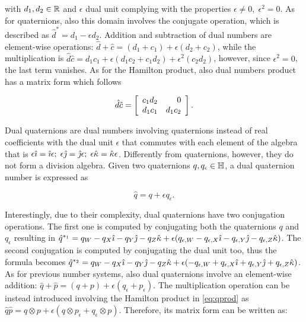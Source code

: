 \documentclass[3p, preprint, twocolumn]{elsarticle}
\begin{document}
\noindent with $d_1, d_2 \in \mathbb{R}$ and $\epsilon$ dual unit complying with the properties $\epsilon \neq 0, \; \epsilon^2 = 0$. As for quaternions, also this domain involves the conjugate operation, which is described as $\hat{d}^* = d_1 - \epsilon d_2$. Addition and subtraction of dual numbers are element-wise operations: $\hat{d} + \hat{c} = (d_1 + c_1) + \epsilon (d_2 + c_2)$, while the multiplication is $\hat{d}\hat{c} = d_1c_1 + \epsilon (d_1c_2 + c_1d_2) + \epsilon^2 (c_2d_2)$, however, since $\epsilon^2=0$, the last term vanishes. As for the Hamilton product, also dual numbers product has a matrix form which follows

\begin{equation}
\label{eq:dualprod}
    \hat{d}\hat{c} = \left[ {\begin{array}{*{20}c}
    \hfill {c_1d_2} & \hfill \hfill {0} \\
   \hfill {d_1c_1} & {d_1c_2} \\
    \end{array}} \right].
\end{equation}


Dual quaternions are dual numbers involving quaternions instead of real coefficients with the dual unit $\epsilon$ that commutes with each element of the algebra that is $\epsilon {\hat{\imath}} = {\hat{\imath}} \epsilon; \; \epsilon {\hat{\jmath}} = {\hat{\jmath}} \epsilon; \; \epsilon {\hat{\kappa}} = {\hat{\kappa}} \epsilon$. Differently from quaternions, however, they do not form a division algebra. Given two quaternions $q, q_{\epsilon} \in \mathbb{H}$, a dual quaternion number is expressed as

\begin{equation}
    \hat{q} = q + \epsilon q_{\epsilon}.
\end{equation}

Interestingly, due to their complexity, dual quaternions have two conjugation operations. The first one is computed by conjugating both the quaternions $q$ and $q_{\epsilon}$ resulting in $\hat{q}^{*_1} = q_W - q_X {\hat{\imath}} - q_Y {\hat{\jmath}} - q_Z {\hat{\kappa}} + \epsilon(q_{\epsilon, W} - q_{\epsilon, X} {\hat{\imath}} - q_{\epsilon, Y} {\hat{\jmath}} - q_{\epsilon, Z} {\hat{\kappa}})$. The second conjugation is computed by conjugating the dual unit too, thus the formula becomes $\hat{q}^{*_2} = q_W - q_X {\hat{\imath}} - q_Y {\hat{\jmath}} - q_Z {\hat{\kappa}} + \epsilon(-q_{\epsilon, W} + q_{\epsilon, X} {\hat{\imath}} + q_{\epsilon, Y} {\hat{\jmath}} + q_{\epsilon, Z} {\hat{\kappa}})$. As for previous number systems, also dual quaternions involve an element-wise addition: $\hat{q} + \hat{p} = (q+p) + \epsilon (q_{\epsilon} + p_{\epsilon})$. The multiplication operation can be instead introduced involving the Hamilton product in \eqref{eq:qprod} as $\hat{q} \hat{p} = q \otimes p + \epsilon (q\otimes p_{\epsilon} + q_{\epsilon} \otimes p)$. Therefore, its matrix form can be written as:
\end{document}
